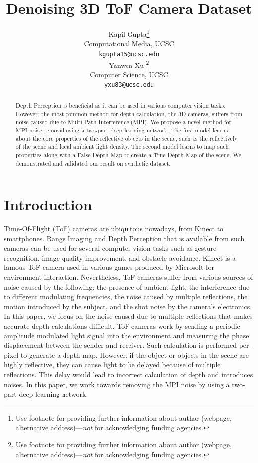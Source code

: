 \documentclass[a4paper, 11pt]{article}
\title{Denoising 3D ToF Camera Dataset}
\author{
  Kapil Gupta\thanks{Use footnote for providing further
    information about author (webpage, alternative
    address)---\emph{not} for acknowledging funding agencies.} \\
  Computational Media, UCSC\\
  \texttt{kgupta15@ucsc.edu} \\
   \And
  Yanwen Xu \thanks{Use footnote for providing further
    information about author (webpage, alternative
    address)---\emph{not} for acknowledging funding agencies.} \\
  Computer Science, UCSC \\
  \texttt{yxu83@ucsc.edu} \\
}
\begin{document}
\maketitle


\begin{abstract}

Depth Perception is beneficial as it can be used in various computer vision tasks. 
However, the most common method for depth calculation, the 3D cameras, suffers from noise caused due to Multi-Path Interference (MPI).
We propose a novel method for MPI noise removal using a two-part deep learning network. 
The first model learns about the core properties of the reflective objects in the scene, such as the reflectively of the scene and local ambient light density. 
The second model learns to map such properties along with a False Depth Map to create a True Depth Map of the scene.
We demonstrated and validated our result on synthetic dataset. 

\end{abstract}





\section{Introduction}

% 
Time-Of-Flight (ToF) cameras are ubiquitous nowadays, from Kinect to smartphones. 
Range Imaging and Depth Perception that is available from such cameras can be used for several computer vision tasks such as gesture recognition, image quality improvement, and obstacle avoidance. 
Kinect is a famous ToF camera used in various games produced by Microsoft for environment interaction. 
Nevertheless, ToF cameras suffer from various sources of noise caused by the following: the presence of ambient light, the interference due to different modulating frequencies, the noise caused by multiple reflections, the motion introduced by the subject, and the shot noise by the camera's electronics. 
In this paper, we focus on the noise caused due to multiple reflections that makes accurate depth calculations difficult. 
ToF cameras work by sending a periodic amplitude modulated light signal into the environment and measuring the phase displacement between the sender and receiver. 
Such calculation is performed per-pixel to generate a depth map. 
However, if the object or objects in the scene are highly reflective, they can cause light to be delayed because of multiple reflections. 
This delay would lead to incorrect calculation of depth and introduces noises. 
In this paper, we work towards removing the MPI noise by using a two-part deep learning network. 
\end{document}
